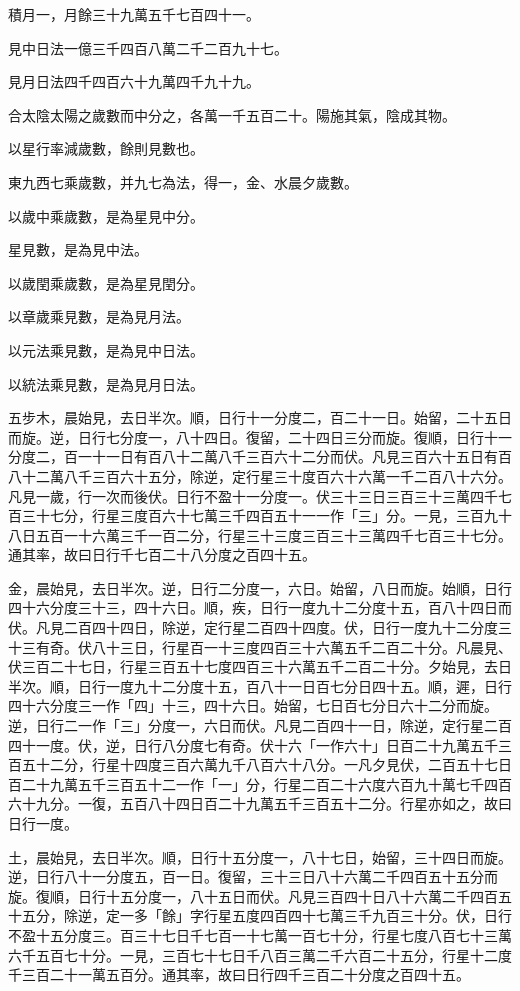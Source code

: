 \begin{pinyinscope}
積月一，月餘三十九萬五千七百四十一。

見中日法一億三千四百八萬二千二百九十七。

見月日法四千四百六十九萬四千九十九。

合太陰太陽之歲數而中分之，各萬一千五百二十。陽施其氣，陰成其物。

以星行率減歲數，餘則見數也。

東九西七乘歲數，并九七為法，得一，金、水晨夕歲數。

以歲中乘歲數，是為星見中分。

星見數，是為見中法。

以歲閏乘歲數，是為星見閏分。

以章歲乘見數，是為見月法。

以元法乘見數，是為見中日法。

以統法乘見數，是為見月日法。

五步木，晨始見，去日半次。順，日行十一分度二，百二十一日。始留，二十五日而旋。逆，日行七分度一，八十四日。復留，二十四日三分而旋。復順，日行十一分度二，百一十一日有百八十二萬八千三百六十二分而伏。凡見三百六十五日有百八十二萬八千三百六十五分，除逆，定行星三十度百六十六萬一千二百八十六分。凡見一歲，行一次而後伏。日行不盈十一分度一。伏三十三日三百三十三萬四千七百三十七分，行星三度百六十七萬三千四百五十一一作「三」分。一見，三百九十八日五百一十六萬三千一百二分，行星三十三度三百三十三萬四千七百三十七分。通其率，故曰日行千七百二十八分度之百四十五。

金，晨始見，去日半次。逆，日行二分度一，六日。始留，八日而旋。始順，日行四十六分度三十三，四十六日。順，疾，日行一度九十二分度十五，百八十四日而伏。凡見二百四十四日，除逆，定行星二百四十四度。伏，日行一度九十二分度三十三有奇。伏八十三日，行星百一十三度四百三十六萬五千二百二十分。凡晨見、伏三百二十七日，行星三百五十七度四百三十六萬五千二百二十分。夕始見，去日半次。順，日行一度九十二分度十五，百八十一日百七分日四十五。順，遲，日行四十六分度三一作「四」十三，四十六日。始留，七日百七分日六十二分而旋。逆，日行二一作「三」分度一，六日而伏。凡見二百四十一日，除逆，定行星二百四十一度。伏，逆，日行八分度七有奇。伏十六「一作六十」日百二十九萬五千三百五十二分，行星十四度三百六萬九千八百六十八分。一凡夕見伏，二百五十七日百二十九萬五千三百五十二一作「一」分，行星二百二十六度六百九十萬七千四百六十九分。一復，五百八十四日百二十九萬五千三百五十二分。行星亦如之，故曰日行一度。

土，晨始見，去日半次。順，日行十五分度一，八十七日，始留，三十四日而旋。逆，日行八十一分度五，百一日。復留，三十三日八十六萬二千四百五十五分而旋。復順，日行十五分度一，八十五日而伏。凡見三百四十日八十六萬二千四百五十五分，除逆，定一多「餘」字行星五度四百四十七萬三千九百三十分。伏，日行不盈十五分度三。百三十七日千七百一十七萬一百七十分，行星七度八百七十三萬六千五百七十分。一見，三百七十七日千八百三萬二千六百二十五分，行星十二度千三百二十一萬五百分。通其率，故曰日行四千三百二十分度之百四十五。


\end{pinyinscope}
